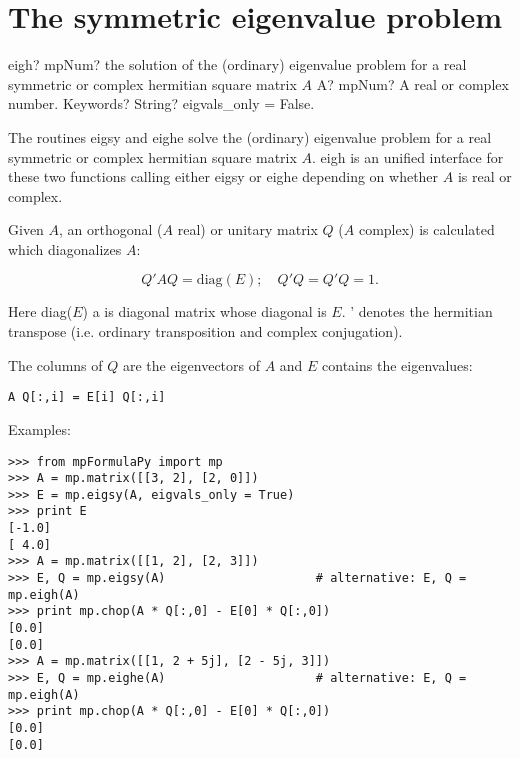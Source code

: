 \newpage
\section{The symmetric eigenvalue problem}


\begin{mpFunctionsExtract}
	\mpFunctionTwo
	{eigh? mpNum? the solution of the (ordinary) eigenvalue problem for a real symmetric or complex hermitian square matrix $A$}
	{A? mpNum? A real or complex number.}
	{Keywords? String? eigvals\_only = False.}	
\end{mpFunctionsExtract}

\vpara
The routines eigsy and eighe solve the (ordinary) eigenvalue problem for a real symmetric or complex hermitian square matrix $A$. eigh is an unified interface for these two functions calling either eigsy or eighe depending on whether $A$ is real or complex.

Given $A$, an orthogonal ($A$ real) or unitary matrix $Q$ ($A$ complex) is calculated which diagonalizes $A$:

\begin{equation}
Q'AQ = \text{diag}(E); \quad Q'Q=Q'Q=1.
\end{equation}

Here diag($E$) a is diagonal matrix whose diagonal is $E$. ' denotes the hermitian transpose (i.e. ordinary transposition and complex conjugation).

The columns of $Q$ are the eigenvectors of $A$ and $E$ contains the eigenvalues:

\begin{lstlisting}
A Q[:,i] = E[i] Q[:,i]
\end{lstlisting}

Examples:

\begin{lstlisting}
>>> from mpFormulaPy import mp
>>> A = mp.matrix([[3, 2], [2, 0]])
>>> E = mp.eigsy(A, eigvals_only = True)
>>> print E
[-1.0]
[ 4.0]
>>> A = mp.matrix([[1, 2], [2, 3]])
>>> E, Q = mp.eigsy(A)                     # alternative: E, Q = mp.eigh(A)
>>> print mp.chop(A * Q[:,0] - E[0] * Q[:,0])
[0.0]
[0.0]
>>> A = mp.matrix([[1, 2 + 5j], [2 - 5j, 3]])
>>> E, Q = mp.eighe(A)                     # alternative: E, Q = mp.eigh(A)
>>> print mp.chop(A * Q[:,0] - E[0] * Q[:,0])
[0.0]
[0.0]
\end{lstlisting}



